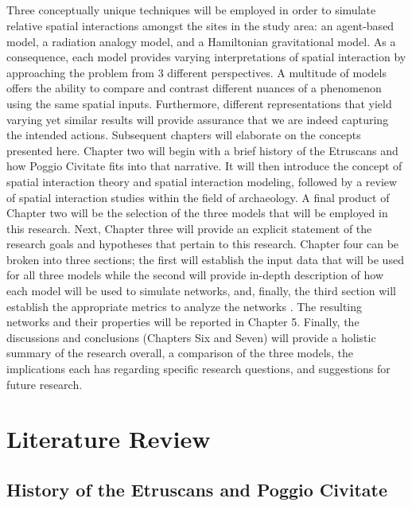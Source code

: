 \documentclass[12pt,a4paper]{thesis}
\begin{document}
\paragraph{}
Three conceptually unique techniques will be employed in order to simulate relative spatial interactions amongst the sites in the study area: an agent-based model, a radiation analogy model, and a Hamiltonian gravitational model. As a consequence, each model provides varying interpretations of spatial interaction by approaching the problem from 3 different perspectives. A multitude of models offers the ability to compare and contrast different nuances of a phenomenon using the same spatial inputs. Furthermore, different representations that yield varying yet similar results will provide assurance that we are indeed capturing the intended actions.
Subsequent chapters will elaborate on the concepts presented here. Chapter two will begin with a brief history of the Etruscans  and how Poggio Civitate fits into that narrative. It will then introduce the concept of spatial interaction theory and spatial interaction modeling, followed by a review of spatial interaction studies within the field of archaeology. A final product of Chapter two will be the selection of the three models that will be employed in this research.  Next, Chapter three will provide an explicit statement of the research goals and hypotheses that pertain to this research. Chapter four can be broken into three sections; the first will establish the input data that will be used for all three models while the second will provide in-depth description of how each model will be used to simulate networks, and, finally, the third section will establish the appropriate metrics to analyze the networks . The resulting networks and their properties will be reported in Chapter 5. Finally, the discussions and conclusions (Chapters Six and Seven) will provide a holistic summary of the research overall, a comparison of the three models, the implications each has regarding specific research questions, and suggestions for future research.

\chapter{Literature Review}
\section{History of the Etruscans and Poggio Civitate}
\end{document}
